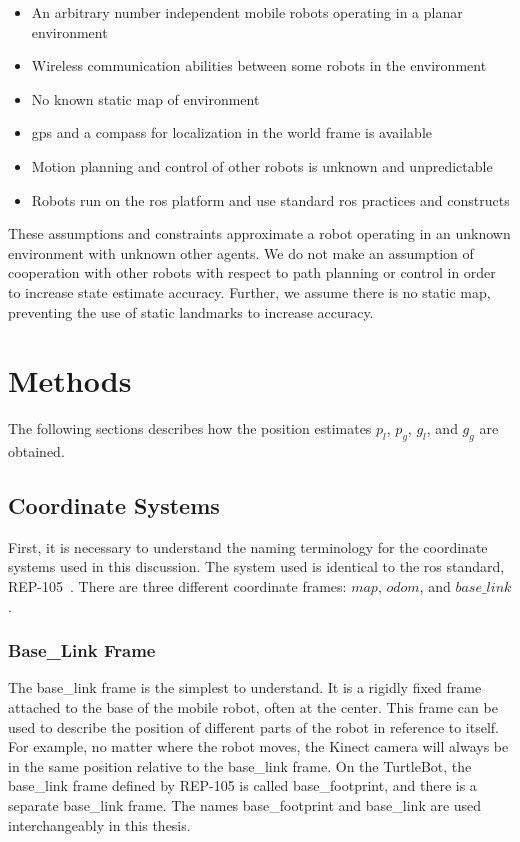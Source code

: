 \documentclass[thesis.tex]{subfile}
\begin{document}
\begin{itemize}
\item An arbitrary number independent mobile robots operating in a planar environment
\item Wireless communication abilities between some robots in the environment
\item No known static map of environment
\item \gls{gps} and a compass for localization in the world frame is available
\item Motion planning and control of other robots is unknown and unpredictable
\item Robots run on the \gls{ros} platform and use standard \gls{ros} practices and constructs
\end{itemize}

These assumptions and constraints approximate a robot operating in an unknown environment with unknown other agents. We do not make an assumption of cooperation with other robots with respect to path planning or control in order to increase state estimate accuracy. Further, we assume there is no static map, preventing the use of static landmarks to increase accuracy.

\section{Methods}
The following sections describes how the position estimates $p_l$, $p_g$, $g_l$, and $g_g$ are obtained.

\subsection{Coordinate Systems}
First, it is necessary to understand the naming terminology for the coordinate systems used in this discussion. The system used is identical to the \gls{ros} standard, REP-105~\cite{REP_105}. There are three different coordinate frames: $map$, $odom$, and $base\_link$.

\subsubsection{Base\_Link Frame}
The base\_link frame is the simplest to understand. It is a rigidly fixed frame attached to the base of the mobile robot, often at the center. This frame can be used to describe the position of different parts of the robot in reference to itself. For example, no matter where the robot moves, the Kinect camera will always be in the same position relative to the base\_link frame. On the TurtleBot, the base\_link frame defined by REP-105 is called base\_footprint, and there is a separate base\_link frame. The names base\_footprint and base\_link are used interchangeably in this thesis. 
\end{document}
